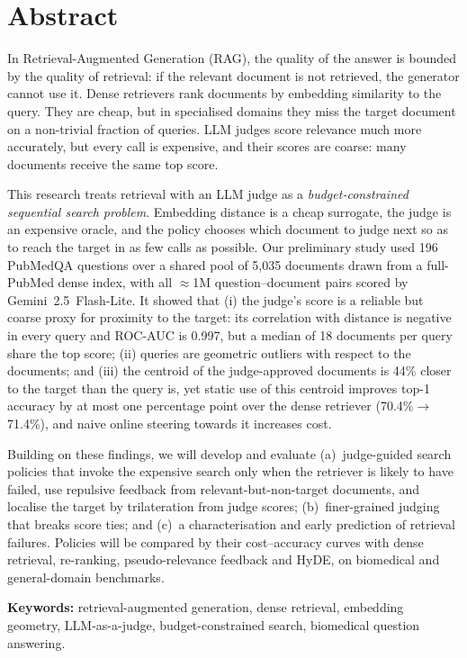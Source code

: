 \chapter*{Abstract}
\label{page:abstract}

In Retrieval-Augmented Generation (RAG), the quality of the answer is bounded by the quality of retrieval: if the relevant document is not retrieved, the generator cannot use it. Dense retrievers rank documents by embedding similarity to the query. They are cheap, but in specialised domains they miss the target document on a non-trivial fraction of queries. LLM judges score relevance much more accurately, but every call is expensive, and their scores are coarse: many documents receive the same top score.

This research treats retrieval with an LLM judge as a \emph{budget-constrained sequential search problem}. Embedding distance is a cheap surrogate, the judge is an expensive oracle, and the policy chooses which document to judge next so as to reach the target in as few calls as possible. Our preliminary study used 196 PubMedQA questions over a shared pool of 5,035 documents drawn from a full-PubMed dense index, with all ${\approx}$1M question--document pairs scored by Gemini~2.5~Flash-Lite. It showed that (i) the judge's score is a reliable but coarse proxy for proximity to the target: its correlation with distance is negative in every query and ROC-AUC is 0.997, but a median of 18 documents per query share the top score; (ii) queries are geometric outliers with respect to the documents; and (iii) the centroid of the judge-approved documents is 44\% closer to the target than the query is, yet static use of this centroid improves top-1 accuracy by at most one percentage point over the dense retriever (70.4\%$\to$71.4\%), and naive online steering towards it increases cost.

Building on these findings, we will develop and evaluate (a)~judge-guided search policies that invoke the expensive search only when the retriever is likely to have failed, use repulsive feedback from relevant-but-non-target documents, and localise the target by trilateration from judge scores; (b)~finer-grained judging that breaks score ties; and (c)~a characterisation and early prediction of retrieval failures. Policies will be compared by their cost--accuracy curves with dense retrieval, re-ranking, pseudo-relevance feedback and HyDE, on biomedical and general-domain benchmarks.

\vspace{6pt}
\noindent\textbf{Keywords:} retrieval-augmented generation, dense retrieval, embedding geometry, LLM-as-a-judge, budget-constrained search, biomedical question answering.
